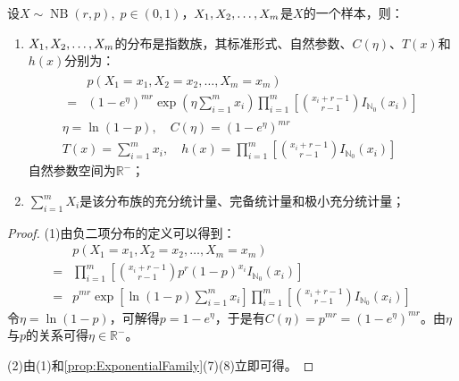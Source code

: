 \begin{theorem}
	设$X\sim\operatorname{NB}(r,p),\;p\in(0,1)$，$X_1, X_2, \dots, X_{m}$是$X$的一个样本，则：
	\begin{enumerate}
		\item $X_1, X_2, \dots, X_{m}$的分布是指数族，其标准形式、自然参数、$C(\eta)$、$T(x)$和$h(x)$分别为：
		\begin{gather*}
			\begin{aligned}
				&p(X_1=x_1,X_2=x_2,\dots,X_m=x_m) \\
				=&(1-e^{\eta})^{mr}\exp\left(\eta\sum_{i=1}^{m}x_i\right)\prod_{i=1}^{m}\left[\binom{x_i+r-1}{r-1}I_{\mathbb{N}_0}(x_i)\right]
			\end{aligned} \\
			\eta=\ln(1-p),\quad C(\eta)=(1-e^{\eta})^{mr} \\
			T(x)=\sum_{i=1}^{m}x_i,\quad h(x)=\prod_{i=1}^{m}\left[\binom{x_i+r-1}{r-1}I_{\mathbb{N}_0}(x_i)\right]
		\end{gather*}
		自然参数空间为$\mathbb{R}^{-}$；
		\item $\sum\limits_{i=1}^{m}X_i$是该分布族的充分统计量、完备统计量和极小充分统计量；
	\end{enumerate}
\end{theorem}
\begin{proof}
	(1)由负二项分布的定义可以得到：
	\begin{align*}
		&p(X_1=x_1,X_2=x_2,\dots,X_m=x_m) \\
		=&\prod_{i=1}^{m}\left[\binom{x_i+r-1}{r-1}p^r(1-p)^{x_i}I_{\mathbb{N}_0}(x_i)\right] \\
		=&p^{mr}\exp\left[\ln(1-p)\sum_{i=1}^{m}x_i\right]\prod_{i=1}^{m}\left[\binom{x_i+r-1}{r-1}I_{\mathbb{N}_0}(x_i)\right]
	\end{align*}
	令$\eta=\ln(1-p)$，可解得$p=1-e^{\eta}$，于是有$C(\eta)=p^{mr}=(1-e^{\eta})^{mr}$。由$\eta$与$p$的关系可得$\eta\in\mathbb{R}^{-}$。\par
	(2)由(1)和\cref{prop:ExponentialFamily}(7)(8)立即可得。
\end{proof}


